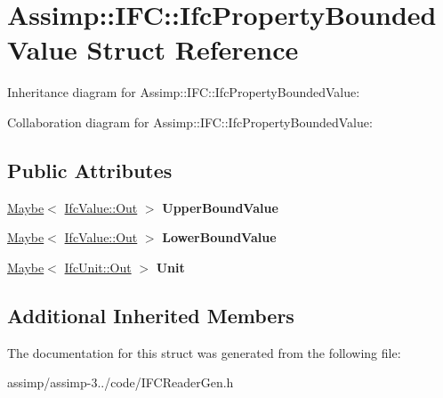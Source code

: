 \hypertarget{struct_assimp_1_1_i_f_c_1_1_ifc_property_bounded_value}{\section{Assimp\+:\+:I\+F\+C\+:\+:Ifc\+Property\+Bounded\+Value Struct Reference}
\label{struct_assimp_1_1_i_f_c_1_1_ifc_property_bounded_value}
}


Inheritance diagram for Assimp\+:\+:I\+F\+C\+:\+:Ifc\+Property\+Bounded\+Value\+:


Collaboration diagram for Assimp\+:\+:I\+F\+C\+:\+:Ifc\+Property\+Bounded\+Value\+:
\subsection*{Public Attributes}
\begin{DoxyCompactItemize}
\item 
\hypertarget{struct_assimp_1_1_i_f_c_1_1_ifc_property_bounded_value_aed706a4fe46e7961bdadcac71ab4866a}{\hyperlink{struct_assimp_1_1_s_t_e_p_1_1_maybe}{Maybe}$<$ \hyperlink{classboost_1_1shared__ptr}{Ifc\+Value\+::\+Out} $>$ {\bfseries Upper\+Bound\+Value}}\label{struct_assimp_1_1_i_f_c_1_1_ifc_property_bounded_value_aed706a4fe46e7961bdadcac71ab4866a}

\item 
\hypertarget{struct_assimp_1_1_i_f_c_1_1_ifc_property_bounded_value_aaa533983b36a5f937ad1bea337b5645f}{\hyperlink{struct_assimp_1_1_s_t_e_p_1_1_maybe}{Maybe}$<$ \hyperlink{classboost_1_1shared__ptr}{Ifc\+Value\+::\+Out} $>$ {\bfseries Lower\+Bound\+Value}}\label{struct_assimp_1_1_i_f_c_1_1_ifc_property_bounded_value_aaa533983b36a5f937ad1bea337b5645f}

\item 
\hypertarget{struct_assimp_1_1_i_f_c_1_1_ifc_property_bounded_value_a2b6e3a2c6906af131bd58bd27af15fa4}{\hyperlink{struct_assimp_1_1_s_t_e_p_1_1_maybe}{Maybe}$<$ \hyperlink{classboost_1_1shared__ptr}{Ifc\+Unit\+::\+Out} $>$ {\bfseries Unit}}\label{struct_assimp_1_1_i_f_c_1_1_ifc_property_bounded_value_a2b6e3a2c6906af131bd58bd27af15fa4}

\end{DoxyCompactItemize}
\subsection*{Additional Inherited Members}


The documentation for this struct was generated from the following file\+:\begin{DoxyCompactItemize}
\item 
assimp/assimp-\/3../code/I\+F\+C\+Reader\+Gen.\+h\end{DoxyCompactItemize}
